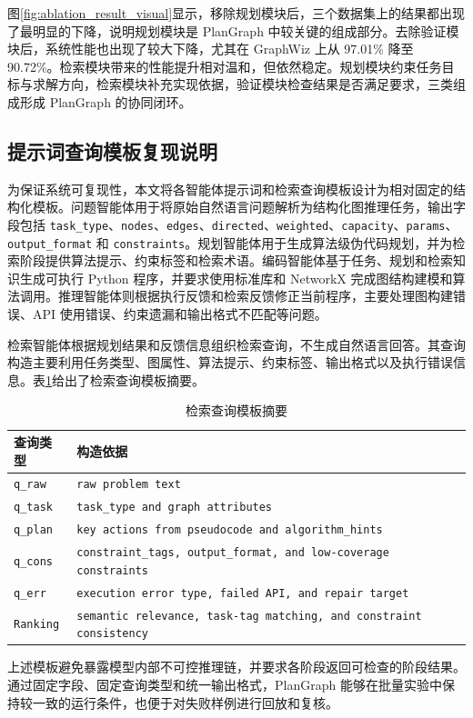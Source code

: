图\ref{fig:ablation_result_visual}显示，移除规划模块后，三个数据集上的结果都出现了最明显的下降，说明规划模块是 PlanGraph 中较关键的组成部分。去除验证模块后，系统性能也出现了较大下降，尤其在 GraphWiz 上从 97.01\% 降至 90.72\%。检索模块带来的性能提升相对温和，但依然稳定。规划模块约束任务目标与求解方向，检索模块补充实现依据，验证模块检查结果是否满足要求，三类组成形成 PlanGraph 的协同闭环。

\subsection{提示词查询模板复现说明}

为保证系统可复现性，本文将各智能体提示词和检索查询模板设计为相对固定的结构化模板。问题智能体用于将原始自然语言问题解析为结构化图推理任务，输出字段包括 \texttt{task\_type}、\texttt{nodes}、\texttt{edges}、\texttt{directed}、\texttt{weighted}、\texttt{capacity}、\texttt{params}、\texttt{output\_format} 和 \texttt{constraints}。规划智能体用于生成算法级伪代码规划，并为检索阶段提供算法提示、约束标签和检索术语。编码智能体基于任务、规划和检索知识生成可执行 Python 程序，并要求使用标准库和 NetworkX 完成图结构建模和算法调用。推理智能体则根据执行反馈和检索反馈修正当前程序，主要处理图构建错误、API 使用错误、约束遗漏和输出格式不匹配等问题。

检索智能体根据规划结果和反馈信息组织检索查询，不生成自然语言回答。其查询构造主要利用任务类型、图属性、算法提示、约束标签、输出格式以及执行错误信息。表\ref{tab:retrieval_query_template}给出了检索查询模板摘要。

\begin{table}[htbp]
\centering
\small
\caption{检索查询模板摘要}
\label{tab:retrieval_query_template}
\begin{tabular}{p{2.0cm}p{10.5cm}}
\toprule
查询类型 & 构造依据 \\
\midrule
\texttt{q\_raw} & \texttt{raw problem text} \\
\texttt{q\_task} & \texttt{task\_type and graph attributes} \\
\texttt{q\_plan} & \texttt{key actions from pseudocode and algorithm\_hints} \\
\texttt{q\_cons} & \texttt{constraint\_tags, output\_format, and low-coverage constraints} \\
\texttt{q\_err} & \texttt{execution error type, failed API, and repair target} \\
\texttt{Ranking} & \texttt{semantic relevance, task-tag matching, and constraint consistency} \\
\bottomrule
\end{tabular}
\end{table}

上述模板避免暴露模型内部不可控推理链，并要求各阶段返回可检查的阶段结果。通过固定字段、固定查询类型和统一输出格式，PlanGraph 能够在批量实验中保持较一致的运行条件，也便于对失败样例进行回放和复核。
